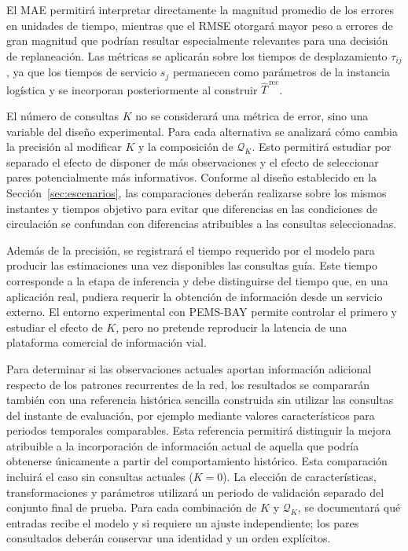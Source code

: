 \documentclass[11pt]{article}
\begin{document}
El MAE permitirá interpretar directamente la magnitud promedio de los errores
en unidades de tiempo, mientras que el RMSE otorgará mayor peso a errores de
gran magnitud que podrían resultar especialmente relevantes para una decisión
de replaneación. Las métricas se aplicarán sobre los tiempos de desplazamiento
\(\tau_{ij}\), ya que los tiempos de servicio \(s_j\) permanecen como
parámetros de la instancia logística y se incorporan posteriormente al
construir \(\widehat{T}^{\,\mathrm{rec}}\).

El número de consultas \(K\) no se considerará una métrica de error, sino una
variable del diseño experimental. Para cada alternativa se analizará cómo
cambia la precisión al modificar \(K\) y la composición de
\(\mathcal{Q}_K\). Esto permitirá estudiar por separado el efecto de disponer
de más observaciones y el efecto de seleccionar pares potencialmente más
informativos. Conforme al diseño establecido en la Sección~\ref{sec:escenarios}, las
comparaciones deberán realizarse sobre los mismos instantes y tiempos objetivo
para evitar que diferencias en las condiciones de circulación se confundan
con diferencias atribuibles a las consultas seleccionadas.

Además de la precisión, se registrará el tiempo requerido por el modelo para
producir las estimaciones una vez disponibles las consultas guía. Este tiempo
corresponde a la etapa de inferencia y debe distinguirse del tiempo que, en una
aplicación real, pudiera requerir la obtención de información desde un
servicio externo. El entorno experimental con PEMS-BAY permite controlar el
primero y estudiar el efecto de \(K\), pero no pretende reproducir la latencia
de una plataforma comercial de información vial.

Para determinar si las observaciones actuales aportan información adicional
respecto de los patrones recurrentes de la red, los resultados se
compararán también con una referencia histórica sencilla construida sin
utilizar las consultas del instante de evaluación, por ejemplo mediante
valores característicos para periodos temporales comparables. Esta referencia
permitirá distinguir la mejora atribuible a la incorporación de información
actual de aquella que podría obtenerse únicamente a partir del comportamiento
histórico. Esta comparación incluirá el caso sin consultas actuales
(\(K=0\)). La elección de características, transformaciones y parámetros
utilizará un periodo de validación separado del conjunto final de prueba.
Para cada combinación de \(K\) y \(\mathcal{Q}_K\), se documentará qué
entradas recibe el modelo y si requiere un ajuste independiente; los pares
consultados deberán conservar una identidad y un orden explícitos.
\end{document}
